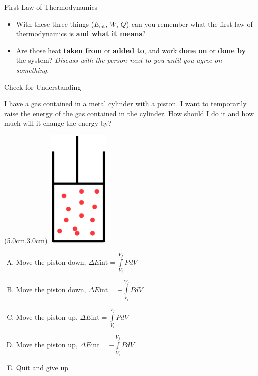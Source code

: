 \documentclass{beamer}
\newcommand{\red}[1]{{\color{red}{#1}}}
\newcommand{\checkl}[2]{\begin{textblock*}{1cm}(#1,#2){\large \red{\Checkmark}}\end{textblock*}}
\begin{document}
\begin{frame}[t]{First Law of Thermodynamics}
\begin{itemize}
   \item With these three things ($E_\text{int}$, $W$, $Q$) can you remember what the first law of thermodynamics is {\bf and what it means}?
   \item<3-> Are those heat {\bf taken from} or {\bf added to}, and work {\bf done on} or {\bf done by} the system? {\it Discuss with the person next to you until you agree on something.}
\end{itemize}
\end{frame}

\begin{frame}[t]{Check for Understanding}
\begin{center}
   I have a gas contained in a metal cylinder with a piston. I want to temporarily raise the energy of the gas contained in the cylinder. How should I do it and how much will it change the energy by?
   \begin{textblock*}{\textwidth}(5.0cm,3.0cm) %
      \includegraphics[width=3.0cm]{figures/mypiston.png}
   \end{textblock*}
   \begin{enumerate}[A.]
      \item Move the piston down, $\Delta E\text{int} = \int\limits_{V_i}^{V_f} PdV$
      \item Move the piston down, $\Delta E\text{int} = -\int\limits_{V_i}^{V_f} PdV$
      \item Move the piston up, $\Delta E\text{int} = \int\limits_{V_i}^{V_f} PdV$
      \item Move the piston up, $\Delta E\text{int} = -\int\limits_{V_i}^{V_f} PdV$
      \item Quit and give up
   \end{enumerate}
\only<2>{\checkl{0.5cm}{4.0cm}}
\end{center}
\end{frame}
\end{document}
